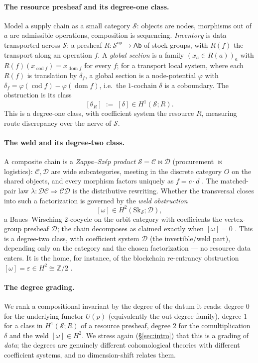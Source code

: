 \documentclass[11pt]{article}
\theoremstyle{definition}
\newcommand{\Ab}{\mathsf{Ab}}
\newcommand{\Sk}{\mathrm{Sk}}
\newcommand{\Z}{\mathbb{Z}}
\newcommand{\sS}{\mathcal{S}}
\newcommand{\cC}{\mathcal{C}}
\newcommand{\cD}{\mathcal{D}}
\begin{document}
\paragraph{The resource presheaf and its degree-one class.}
Model a supply chain as a small category $\sS$: objects are nodes, morphisms out of $a$ are
admissible operations, composition is sequencing. \emph{Inventory} is data transported across
$\sS$: a presheaf $R\colon\sS^{\mathrm{op}}\to\Ab$ of stock-groups, with $R(f)$ the transport along
an operation $f$. A \emph{global section} is a family $(x_a\in R(a))_a$ with
$R(f)(x_{\operatorname{cod}f})=x_{\operatorname{dom}f}$ for every $f$; for a transport local
system, where each $R(f)$ is translation by $\delta_f$, a global section is a node-potential
$\varphi$ with $\delta_f=\varphi(\operatorname{cod}f)-\varphi(\operatorname{dom}f)$, i.e.\ the
$1$-cochain $\delta$ is a coboundary. The obstruction is its class
\[
   [\theta_R]\;:=\;[\delta]\in H^1(\sS;R).
\]
This is a degree-one class, with coefficient system the resource $R$, measuring route discrepancy
over the nerve of $\sS$.

\paragraph{The weld and its degree-two class.}
A composite chain is a \emph{Zappa--Sz\'ep product} $\sS=\cC\bowtie\cD$ (procurement $\bowtie$
logistics): $\cC,\cD$ are wide subcategories, meeting in the discrete category $O$ on the shared
objects, and every morphism factors uniquely as $f=c\cdot d$ \cite{AhmanUustalu2016,MacBethZS}. The
matched-pair law $\lambda\colon\cD\cC\Rightarrow\cC\cD$ is the distributive rewriting. Whether the
transversal closes into such a factorization is governed by the \emph{weld obstruction}
\[
   [\omega]\in H^2(\Sk_\sS;\cD),
\]
a Baues--Wirsching $2$-cocycle on the orbit category with coefficients the vertex-group presheaf
$\cD$; the chain decomposes as claimed exactly when $[\omega]=0$ \cite{MacBethZS}. This is a
degree-two class, with coefficient system $\cD$ (the invertible/weld part), depending only on the
category and the chosen factorization --- no resource data enters. It is the home, for instance, of
the blockchain re-entrancy obstruction $[\omega]=\varepsilon\in H^2\cong\Z/2$
\cite{MacBethReentrancy}.

\paragraph{The degree grading.}
We rank a compositional invariant by the degree of the datum it reads: degree $0$ for the
underlying functor $U(p)$ (equivalently the out-degree family), degree $1$ for a class in
$H^1(\sS;R)$ of a resource presheaf, degree $2$ for the comultiplication $\delta$ and the weld
$[\omega]\in H^2$. We stress again (\S\ref{sec:intro}) that this is a grading of \emph{data}; the
degrees are genuinely different cohomological theories with different coefficient systems, and no
dimension-shift relates them.
\end{document}
